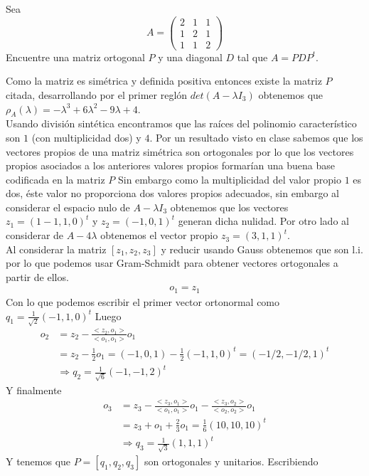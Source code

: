 \documentclass[letter]{memoir} %
\newenvironment{cframed}[1][blue]
  {\begin{tcolorbox}[colframe=#1,colback=white]}
  {\end{tcolorbox}}
\begin{document}
\begin{enumerate}
\begin{cframed}[violet]
\item 
Sea
\[A   = \begin{pmatrix}
			2 & 1 & 1 \\
            1 & 2  &1 \\
             1 & 1 & 2
            \end{pmatrix} 
\]
Encuentre una matriz ortogonal $P$ y una diagonal $D$ tal que $A = PDP^t$.
\end{cframed}
Como la matriz es simétrica y definida positiva entonces existe la matriz $P$ citada, desarrollando por el primer reglón $det(A-\lambda I_3)$ obtenemos que $\rho_A(\lambda)= -\lambda ^ 3 +6\lambda^2 -9\lambda +4 $.\\
Usando división sintética encontramos que las raíces del polinomio característico son $1$ (con multiplicidad dos) y $4$. Por un resultado visto en clase sabemos que los vectores propios de una matriz simétrica son ortogonales por lo que los vectores propios asociados a los anteriores valores propios formarían una buena base codificada en la matriz $P$ 
Sin embargo como la multiplicidad del valor propio $1$ es dos, éste valor no proporciona dos valores propios adecuados, sin embargo al considerar el espacio nulo de $A- \lambda I_3$ obtenemos que los vectores $z_1 = (1-1,1,0)^t$ y $z_2=(-1,0,1)^t$ generan dicha nulidad.
Por otro lado al considerar de $A-4\lambda$ obtenemos el vector propio $z_3 =(3,1,1)^t$.\\
Al considerar la matriz $[z_1,z_2,z_3]$ y reducir usando Gauss obtenemos que son l.i. por lo que podemos usar Gram-Schmidt para obtener vectores ortogonales a partir de ellos.
\begin{equation*}
\begin{split}
o_1 = z_1
\end{split}
\end{equation*}
Con lo que podemos escribir el primer vector ortonormal como $q_1 = \frac{1}{\sqrt{2}}(-1,1,0)^t$
Luego 
\begin{equation*}
\begin{split}
o_2 &= z_2 - \frac{<z_2,o_1>}{<o_1, o_1>}o_1 \\
 & = z_2 - \frac{1}{2}o_1 = (-1,0,1) - \frac{1}{2}(-1 , 1,0 )^t = (-1/2,-1/2,1)^t \\
 & \Rightarrow q_2 = \frac{1}{\sqrt{6}} (-1,-1,2)^t
\end{split}
\end{equation*}
Y finalmente 
\begin{equation*}
\begin{split}
o_3 &= z_3 - \frac{<z_3,o_1>}{<o_1, o_1>}o_1 -\frac{<z_3,o_2>}{<o_2, o_2>}o_1 \\
 &= z_3 + o_1 + \frac{2}{3}o_1 = \frac{1}{6}(10,10,10)^t \\
 & \Rightarrow q_3 = \frac{1}{\sqrt{3}} (1,1,1)^t
\end{split}
\end{equation*}
Y tenemos que $P = [q_1,q_2,q_3]$ son ortogonales y unitarios.
Escribiendo 


\end{enumerate}
\end{document}
